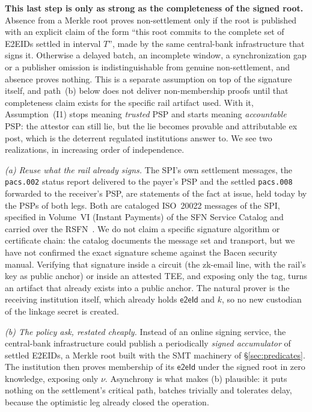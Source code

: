 \documentclass[11pt]{article}
\newcommand{\eeid}{\ensuremath{\mathsf{e2eId}}}
\newcommand{\code}[1]{\texttt{#1}}
\begin{document}
\textbf{This last step is only as strong as the completeness of the signed
root.} Absence from a
Merkle root proves non-settlement only if the root is published with an
explicit claim of the form ``this root commits to the complete set of E2EIDs
settled in interval $T$'', made by the same central-bank infrastructure that
signs it. Otherwise a delayed batch, an incomplete window, a synchronization
gap or a publisher omission is indistinguishable from genuine non-settlement,
and absence proves nothing. This is a separate assumption on top of the
signature itself, and path~(b) below does not deliver non-membership proofs
until that completeness claim exists for the specific rail artifact used. With
it, Assumption~(I1) stops meaning \emph{trusted} PSP and starts meaning
\emph{accountable} PSP: the attestor can still lie, but the lie becomes
provable and attributable ex post, which is the deterrent regulated
institutions answer to. We see two realizations, in increasing order of
independence.

\emph{(a) Reuse what the rail already signs.} The SPI's own settlement
messages, the \code{pacs.002} status report delivered to the payer's PSP and
the settled \code{pacs.008} forwarded to the receiver's PSP, are statements of
the fact at issue, held today by the PSPs of both legs. Both are cataloged
ISO~20022 messages of the SPI, specified in Volume~VI (Instant Payments) of the
SFN Service Catalog and carried over the RSFN~\cite{spicatalog}. We do not
claim a specific signature algorithm or certificate chain: the catalog
documents the message set and transport, but we have not confirmed the exact
signature scheme against the Bacen security manual. Verifying that signature
inside a circuit (the zk-email line, with the rail's key as public anchor) or
inside an attested TEE, and exposing only the tag, turns an artifact that
already exists into a public anchor. The natural prover is the receiving
institution itself, which already holds \eeid{} and $k$, so no new custodian of
the linkage secret is created.

\emph{(b) The policy ask, restated cheaply.} Instead of an online signing
service, the central-bank infrastructure could publish a periodically
\emph{signed accumulator} of settled E2EIDs, a Merkle root built with the SMT
machinery of \S\ref{sec:predicates}. The institution then proves membership of
its \eeid{} under the signed root in zero knowledge, exposing only $\nu$.
Asynchrony is what makes (b) plausible: it puts nothing on the settlement's
critical path, batches trivially and tolerates delay, because the optimistic
leg already closed the operation.
\end{document}
